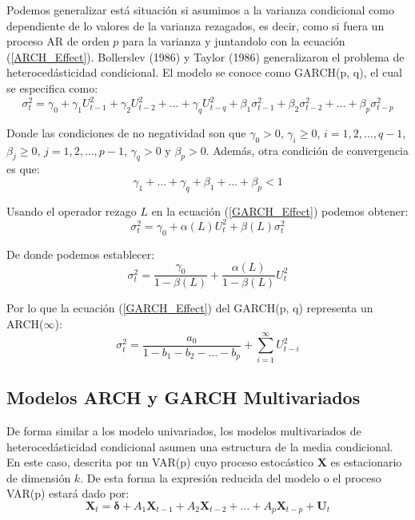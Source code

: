 \documentclass[
  a4paper,
]{article}
\begin{document}
Podemos generalizar está situación si asumimos a la varianza condicional
como dependiente de lo valores de la varianza rezagados, es decir, como
si fuera un proceso AR de orden \(p\) para la varianza y juntandolo con
la ecuación (\ref{ARCH_Effect}). Bollerslev (1986) y Taylor (1986)
generalizaron el problema de heterocedásticidad condicional. El modelo
se conoce como GARCH(p, q), el cual se especifica como: \[
    \sigma^2_t = \gamma_0 + \gamma_1 U_{t-1}^2 + \gamma_2 U_{t-2}^2 + \ldots + \gamma_q U_{t-q}^2 + \beta_1 \sigma^2_{t-1} + \beta_2 \sigma^2_{t-2} + \ldots + \beta_p \sigma^2_{t-p}
    \label{GARCH_Effect}
\]

Donde las condiciones de no negatividad son que \(\gamma_0 > 0\),
\(\gamma_i \geq 0\), \(i = 1, 2, \ldots, q-1\), \(\beta_j \geq 0\),
\(j = 1, 2, \ldots, p-1\), \(\gamma_q > 0\) y \(\beta_p > 0\). Además,
otra condición de convergencia es que: \begin{equation*}
    \gamma_1 + \ldots + \gamma_q + \beta_1 + \ldots + \beta_p < 1
\end{equation*}

Usando el operador rezago \(L\) en la ecuación (\ref{GARCH_Effect})
podemos obtener: \[
    \sigma^2_t = \gamma_0 + \alpha(L) U_t^2 + \beta(L) \sigma^2_t
    \label{GARCH_Effect_L}
\]

De donde podemos establecer: \[
    \sigma^2_t = \frac{\gamma_0}{1 - \beta(L)} + \frac{\alpha(L)}{1 - \beta(L)} U_t^2 
\]

Por lo que la ecuación (\ref{GARCH_Effect}) del GARCH(p, q) representa
un ARCH(\(\infty\)): \[
    \sigma^2_t = \frac{a_0}{1 - b_1 - b_2 - \ldots - b_p} + \sum_{i = 1}^\infty U_{t-i}^2 
\]

\hypertarget{modelos-arch-y-garch-multivariados}{%
\subsection{Modelos ARCH y GARCH
Multivariados}\label{modelos-arch-y-garch-multivariados}}

De forma similar a los modelo univariados, los modelos multivariados de
heterocedásticidad condicional asumen una estructura de la media
condicional. En este caso, descrita por un VAR(p) cuyo proceso
estocástico \(\mathbf{X}\) es estacionario de dimensión \(k\). De esta
forma la expresión reducida del modelo o el proceso VAR(p) estará dado
por: \[
    \mathbf{X}_t = \mathbf{\delta} + A_1 \mathbf{X}_{t-1} + A_2 \mathbf{X}_{t-2} + \ldots + A_p \mathbf{X}_{t-p} + \mathbf{U}_{t}
\]
\end{document}
